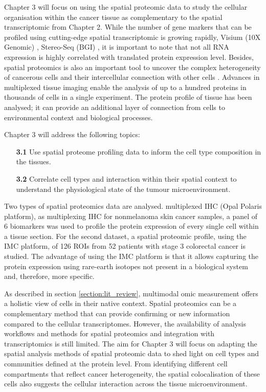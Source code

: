 Chapter 3 will focus on using the spatial proteomic data to study the cellular organisation within the cancer tissue as complementary to the spatial transcriptomic from Chapter 2. While the number of gene markers that can be profiled using cutting-edge spatial transcriptomic is growing rapidly, \ie Visium (10X Genomic) \cite{thrane2018spatially, moncada2019integrating,ji2020multimodal},  Stereo-Seq (BGI) \cite{wei2022single,chen2022spatiotemporal}, it is important to note that not all RNA expression is highly correlated with translated protein expression level. Besides, spatial proteomics is also an important tool to uncover the complex heterogeneity of cancerous cells and their intercellular connection with other cells \cite{arnol2019modeling, jackson2020single, bodenmiller2016multiplexed}. Advances in multiplexed tissue imaging enable the analysis of up to a hundred proteins in thousands of cells in a single experiment. The protein profile of tissue has been analysed; it can provide an additional layer of connection from cells to environmental context and biological processes. 

Chapter 3 will address the following topics:    
\begin{enumerate}[align=left]
    \item[\textbf{3.1}] Use spatial proteome profiling data to inform the cell type composition in the tissues.
    \item[\textbf{3.2}] Correlate cell types and interaction within their spatial context to understand the physiological state of the tumour microenvironment.
\end{enumerate}

Two types of spatial proteomics data are analysed. multiplexed IHC (Opal Polaris platform), as multiplexing IHC for nonmelanoma skin cancer samples, a panel of 6 biomarkers was used to profile the protein expression of every single cell within a tissue section. For the second dataset, a spatial proteomic profile, using the IMC platform, of 126 ROIs from 52 patients with stage 3 colorectal cancer is studied. The advantage of using the IMC platform is that it allows capturing the protein expression using rare-earth isotopes not present in a biological system and, therefore, more specific. 

As described in section \ref{section:lit_review}, multimodal omic measurement offers a holistic view of cells in their native context. Spatial proteomics can be a complementary method that can provide confirming or new information compared to the cellular transcriptomes. However, the availability of analysis workflows and methods for spatial proteomics and integration with transcriptomics is still limited. The aim for Chapter 3 will focus on adapting the spatial analysis methods of spatial proteomic data to shed light on cell types and communities defined at the protein level. From identifying different cell compartments that reflect cancer heterogeneity, the spatial colocalisation of these cells also suggests the cellular interaction across the tissue microenvironment.             

